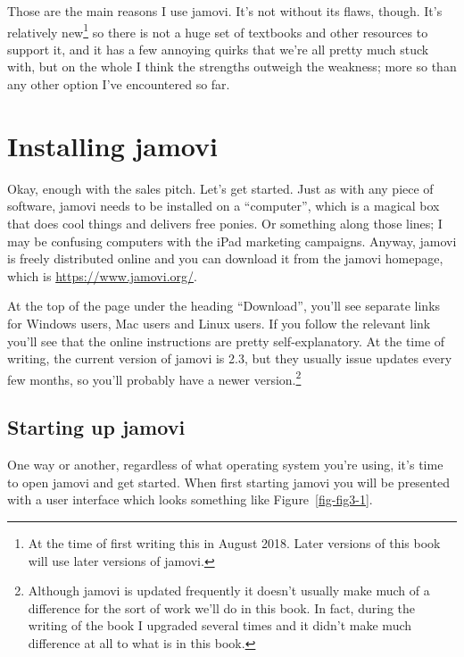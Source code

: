 \documentclass[
  a4paper,
]{book}
\begin{document}
Those are the main reasons I use jamovi. It's not without its flaws,
though. It's relatively new\footnote{At the time of first writing this
  in August 2018. Later versions of this book will use later versions of
  jamovi.} so there is not a huge set of textbooks and other resources
to support it, and it has a few annoying quirks that we're all pretty
much stuck with, but on the whole I think the strengths outweigh the
weakness; more so than any other option I've encountered so far.

\hypertarget{installing-jamovi}{%
\section{Installing jamovi}\label{installing-jamovi}}

Okay, enough with the sales pitch. Let's get started. Just as with any
piece of software, jamovi needs to be installed on a ``computer'', which
is a magical box that does cool things and delivers free ponies. Or
something along those lines; I may be confusing computers with the iPad
marketing campaigns. Anyway, jamovi is freely distributed online and you
can download it from the jamovi homepage, which is
\url{https://www.jamovi.org/}.

At the top of the page under the heading ``Download'', you'll see
separate links for Windows users, Mac users and Linux users. If you
follow the relevant link you'll see that the online instructions are
pretty self-explanatory. At the time of writing, the current version of
jamovi is 2.3, but they usually issue updates every few months, so
you'll probably have a newer version.\footnote{Although jamovi is
  updated frequently it doesn't usually make much of a difference for
  the sort of work we'll do in this book. In fact, during the writing of
  the book I upgraded several times and it didn't make much difference
  at all to what is in this book.}

\hypertarget{starting-up-jamovi}{%
\subsection{Starting up jamovi}\label{starting-up-jamovi}}

One way or another, regardless of what operating system you're using,
it's time to open jamovi and get started. When first starting jamovi you
will be presented with a user interface which looks something like
Figure~\ref{fig-fig3-1}.
\end{document}
